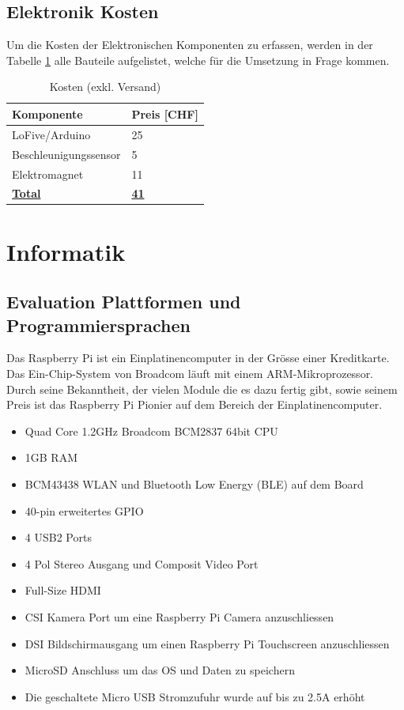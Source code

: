\documentclass[a4paper]{report}
\begin{document}
\subsection{Elektronik Kosten}
\label{app:ssec:ETKosten}
Um die Kosten der Elektronischen Komponenten zu erfassen, werden in der Tabelle
\ref{tab:elektronikkosten} alle Bauteile aufgelistet, welche für die Umsetzung
in Frage kommen. \parencite{Meier2013} \parencite{ReicheltE2017} \parencite{RenoDenver2017}

\noindent
\begin{table}[h!]
	\begin{tabular}{|p{}|p{}|}
		\hline
		\textbf{Komponente} & \textbf{Preis [CHF]} \\
		\hline
		LoFive/Arduino & 25 \\
		\hline
		Beschleunigungssensor & 5 \\
		\hline
		Elektromagnet & 11 \\
		\hline
		\underline{\textbf{Total}} & \underline{\textbf{41}} \\
		\hline
	\end{tabular}
	\caption{Kosten (exkl. Versand)}
	\label{tab:elektronikkosten}
\end{table}


\section{Informatik}
\label{app:sec:Inf}

\subsection{Evaluation Plattformen und Programmiersprachen}
\label{app:ssec:EvalPlattPrg}
Das Raspberry Pi ist ein Einplatinencomputer in der Grösse einer Kreditkarte. Das Ein-Chip-System von Broadcom läuft mit einem ARM-Mikroprozessor. Durch seine Bekanntheit, der vielen Module die es dazu fertig gibt, sowie seinem Preis ist das Raspberry Pi Pionier auf dem Bereich der Einplatinencomputer.

\begin{itemize}[noitemsep]
	\item Quad Core 1.2GHz Broadcom BCM2837 64bit CPU
	\item 1GB RAM
	\item BCM43438 WLAN und Bluetooth Low Energy (BLE) auf dem Board
	\item 40-pin erweitertes GPIO
	\item 4 USB2 Ports
	\item 4 Pol Stereo Ausgang und Composit Video Port
	\item Full-Size HDMI
	\item CSI Kamera Port um eine Raspberry Pi Camera anzuschliessen
	\item DSI Bildschirmausgang um einen Raspberry Pi Touchscreen anzuschliessen
	\item MicroSD Anschluss um das OS und Daten zu speichern
	\item Die geschaltete Micro USB Stromzufuhr wurde auf bis zu 2.5A erhöht
\end{itemize}\parencite{RaspberryPiFoundation2017}
\end{document}
